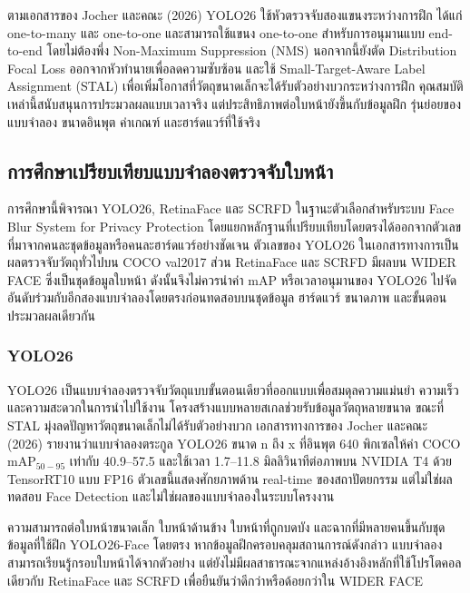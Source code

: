 ตามเอกสารของ Jocher และคณะ (2026) \cite{jocher2026yolo26} YOLO26 ใช้หัวตรวจจับสองแขนงระหว่างการฝึก ได้แก่ one-to-many และ one-to-one และสามารถใช้แขนง one-to-one สำหรับการอนุมานแบบ end-to-end โดยไม่ต้องพึ่ง Non-Maximum Suppression (NMS) นอกจากนี้ยังตัด Distribution Focal Loss ออกจากหัวทำนายเพื่อลดความซับซ้อน และใช้ Small-Target-Aware Label Assignment (STAL) เพื่อเพิ่มโอกาสที่วัตถุขนาดเล็กจะได้รับตัวอย่างบวกระหว่างการฝึก คุณสมบัติเหล่านี้สนับสนุนการประมวลผลแบบเวลาจริง แต่ประสิทธิภาพต่อใบหน้ายังขึ้นกับข้อมูลฝึก รุ่นย่อยของแบบจำลอง ขนาดอินพุต ค่าเกณฑ์ และฮาร์ดแวร์ที่ใช้จริง

\subsection{การศึกษาเปรียบเทียบแบบจำลองตรวจจับใบหน้า}

การศึกษานี้พิจารณา YOLO26, RetinaFace และ SCRFD ในฐานะตัวเลือกสำหรับระบบ Face Blur System for Privacy Protection โดยแยกหลักฐานที่เปรียบเทียบโดยตรงได้ออกจากตัวเลขที่มาจากคนละชุดข้อมูลหรือคนละฮาร์ดแวร์อย่างชัดเจน ตัวเลขของ YOLO26 ในเอกสารทางการเป็นผลตรวจจับวัตถุทั่วไปบน COCO val2017 ส่วน RetinaFace และ SCRFD มีผลบน WIDER FACE ซึ่งเป็นชุดข้อมูลใบหน้า ดังนั้นจึงไม่ควรนำค่า mAP หรือเวลาอนุมานของ YOLO26 ไปจัดอันดับร่วมกับอีกสองแบบจำลองโดยตรงก่อนทดสอบบนชุดข้อมูล ฮาร์ดแวร์ ขนาดภาพ และขั้นตอนประมวลผลเดียวกัน \cite{ultralytics2026yolo26docs,deng2020retinaface,guo2021scrfd}

\subsubsection{YOLO26}

YOLO26 เป็นแบบจำลองตรวจจับวัตถุแบบขั้นตอนเดียวที่ออกแบบเพื่อสมดุลความแม่นยำ ความเร็ว และความสะดวกในการนำไปใช้งาน โครงสร้างแบบหลายสเกลช่วยรับข้อมูลวัตถุหลายขนาด ขณะที่ STAL มุ่งลดปัญหาวัตถุขนาดเล็กไม่ได้รับตัวอย่างบวก เอกสารทางการของ Jocher และคณะ (2026) รายงานว่าแบบจำลองตระกูล YOLO26 ขนาด n ถึง x ที่อินพุต 640 พิกเซลให้ค่า COCO mAP$_{50-95}$ เท่ากับ 40.9--57.5 และใช้เวลา 1.7--11.8 มิลลิวินาทีต่อภาพบน NVIDIA T4 ด้วย TensorRT10 แบบ FP16 ตัวเลขนี้แสดงศักยภาพด้าน real-time ของสถาปัตยกรรม แต่ไม่ใช่ผลทดสอบ Face Detection และไม่ใช่ผลของแบบจำลองในระบบโครงงาน \cite{ultralytics2026yolo26docs}

ความสามารถต่อใบหน้าขนาดเล็ก ใบหน้าด้านข้าง ใบหน้าที่ถูกบดบัง และฉากที่มีหลายคนขึ้นกับชุดข้อมูลที่ใช้ฝึก YOLO26-Face โดยตรง หากข้อมูลฝึกครอบคลุมสถานการณ์ดังกล่าว แบบจำลองสามารถเรียนรู้กรอบใบหน้าได้จากตัวอย่าง แต่ยังไม่มีผลสาธารณะจากแหล่งอ้างอิงหลักที่ใช้โปรโตคอลเดียวกับ RetinaFace และ SCRFD เพื่อยืนยันว่าดีกว่าหรือด้อยกว่าใน WIDER FACE

